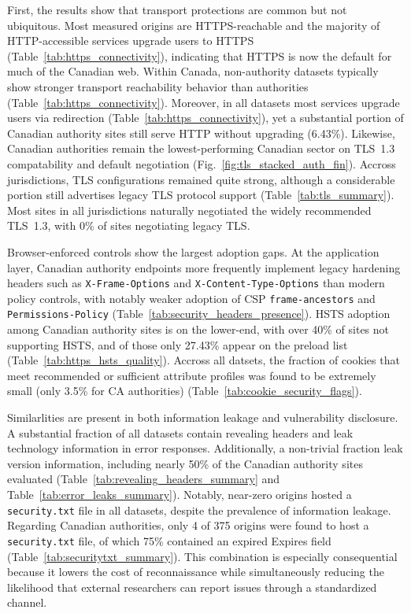 \documentclass[conference]{IEEEtran}
\begin{document}
    
First, the results show that transport protections are common but not ubiquitous. 
Most measured origins are HTTPS-reachable and the majority of HTTP-accessible services upgrade users to HTTPS (Table~\ref{tab:https_connectivity}), 
indicating that HTTPS is now the default for much of the Canadian web. Within Canada, non-authority datasets typically
show stronger transport reachability behavior than authorities (Table~\ref{tab:https_connectivity}).  
Moreover, in all datasets most services upgrade users via redirection (Table~\ref{tab:https_connectivity}),
yet a substantial portion of Canadian authority sites still serve HTTP without upgrading (6.43\%). Likewise, Canadian
authorities remain the lowest-performing Canadian sector on TLS~1.3 compatability and default negotiation (Fig.~\ref{fig:tls_stacked_auth_fin}). 
Accross jurisdictions, TLS configurations remained quite strong, although a considerable portion still advertises legacy TLS protocol support (Table~\ref{tab:tls_summary}). 
Most sites in all jurisdictions naturally negotiated the widely recommended TLS~1.3, with 0\% of sites negotiating legacy TLS.

Browser-enforced controls show the largest adoption gaps. At the application layer, Canadian authority endpoints more frequently implement legacy hardening
 headers such as \texttt{X-Frame-Options} and \texttt{X-Content-Type-Options} than modern policy controls, with notably weaker adoption
 of CSP \texttt{frame-ancestors} and \texttt{Permissions-Policy} (Table~\ref{tab:security_headers_presence}). HSTS adoption among Canadian
authority sites is on the lower-end, with over 40\% of sites not supporting HSTS, and of those only 27.43\% appear on the preload list (Table~\ref{tab:https_hsts_quality}).
Accross all datsets, the fraction of cookies that meet recommended or sufficient attribute profiles was found to be extremely small
 (only 3.5\% for CA authorities) (Table~\ref{tab:cookie_security_flags}).

Similarlities are present in both information leakage and vulnerability disclosure. A substantial fraction of all datasets contain revealing headers and
leak technology information in error responses. Additionally, a non-trivial fraction leak version information, including nearly 50\% of the Canadian authority sites evaluated (Table~\ref{tab:revealing_headers_summary} and Table~\ref{tab:error_leaks_summary}). 
Notably, near-zero origins hosted a \texttt{security.txt} file in all datasets, despite the prevalence of information leakage. Regarding Canadian authorities, 
only 4 of 375 origins were found to host a \texttt{security.txt} file, of which 75\% contained an expired Expires field (Table~\ref{tab:securitytxt_summary}). 
This combination is especially consequential because it lowers the cost of reconnaissance while simultaneously reducing the likelihood that external researchers 
can report issues through a standardized channel.
\end{document}
